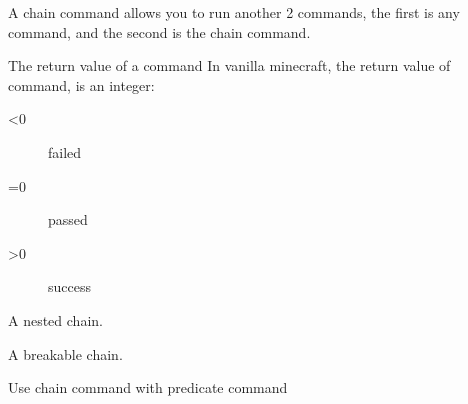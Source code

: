 \label{ch:chain}

A chain command allows you to run another 2 commands, the first is any command, and the second is the chain command.

\begin{note}{The return value of a command}
    In vanilla minecraft, the return value of command, is an integer:
    \begin{description}
        \item[<0]{failed}
        \item[=0] {passed}
        \item[>0]{success}
    \end{description}
\end{note}



\begin{example}{A nested chain.}
\end{example}

\begin{example}{A breakable chain.}
\end{example}

\begin{example}{Use chain command with predicate command}
\end{example}
